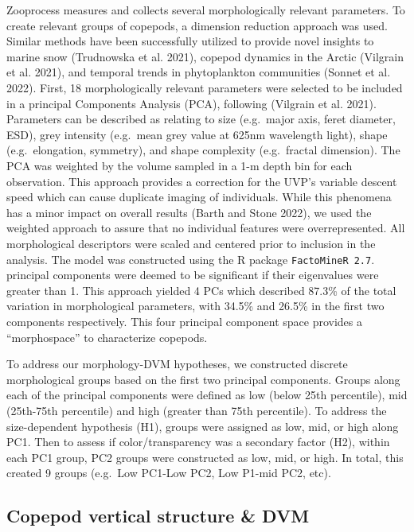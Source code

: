\documentclass[
]{article}
\begin{document}
Zooprocess measures and collects several morphologically relevant
parameters. To create relevant groups of copepods, a dimension reduction
approach was used. Similar methods have been successfully utilized to
provide novel insights to marine snow (Trudnowska et al. 2021), copepod
dynamics in the Arctic (Vilgrain et al. 2021), and temporal trends in
phytoplankton communities (Sonnet et al. 2022). First, 18
morphologically relevant parameters were selected to be included in a
principal Components Analysis (PCA), following (Vilgrain et al. 2021).
Parameters can be described as relating to size (e.g.~major axis, feret
diameter, ESD), grey intensity (e.g.~mean grey value at 625nm wavelength
light), shape (e.g.~elongation, symmetry), and shape complexity
(e.g.~fractal dimension). The PCA was weighted by the volume sampled in
a 1-m depth bin for each observation. This approach provides a
correction for the UVP's variable descent speed which can cause
duplicate imaging of individuals. While this phenomena has a minor
impact on overall results (Barth and Stone 2022), we used the weighted
approach to assure that no individual features were overrepresented. All
morphological descriptors were scaled and centered prior to inclusion in
the analysis. The model was constructed using the R package
\texttt{FactoMineR\ 2.7}. principal components were deemed to be
significant if their eigenvalues were greater than 1. This approach
yielded 4 PCs which described 87.3\% of the total variation in
morphological parameters, with 34.5\% and 26.5\% in the first two
components respectively. This four principal component space provides a
``morphospace'' to characterize copepods.

To address our morphology-DVM hypotheses, we constructed discrete
morphological groups based on the first two principal components. Groups
along each of the principal components were defined as low (below 25th
percentile), mid (25th-75th percentile) and high (greater than 75th
percentile). To address the size-dependent hypothesis (H1), groups were
assigned as low, mid, or high along PC1. Then to assess if
color/transparency was a secondary factor (H2), within each PC1 group,
PC2 groups were constructed as low, mid, or high. In total, this created
9 groups (e.g.~Low PC1-Low PC2, Low P1-mid PC2, etc).

\hypertarget{copepod-vertical-structure-dvm}{%
\subsection{Copepod vertical structure \&
DVM}\label{copepod-vertical-structure-dvm}}
\end{document}
